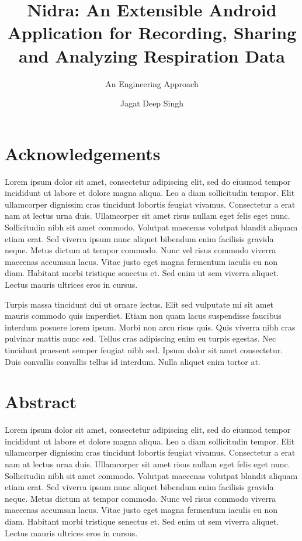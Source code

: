\documentclass[UKenglish]{ifimaster}  %
\title{Nidra: An Extensible Android Application for Recording, Sharing and Analyzing Respiration Data}
\subtitle{An Engineering Approach}
\author{Jagat Deep Singh}
\begin{document}
\duoforside[dept={Department of Informatics},   %
  program={Programming and Networks},  %
  long]                                        %

\frontmatter{}
\chapter*{Acknowledgements}
    Lorem ipsum dolor sit amet, consectetur adipiscing elit, sed do eiusmod tempor incididunt ut labore et dolore magna aliqua. Leo a diam sollicitudin tempor. Elit ullamcorper dignissim cras tincidunt lobortis feugiat vivamus. Consectetur a erat nam at lectus urna duis. Ullamcorper sit amet risus nullam eget felis eget nunc. Sollicitudin nibh sit amet commodo. Volutpat maecenas volutpat blandit aliquam etiam erat. Sed viverra ipsum nunc aliquet bibendum enim facilisis gravida neque. Metus dictum at tempor commodo. Nunc vel risus commodo viverra maecenas accumsan lacus. Vitae justo eget magna fermentum iaculis eu non diam. Habitant morbi tristique senectus et. Sed enim ut sem viverra aliquet. Lectus mauris ultrices eros in cursus.

    Turpis massa tincidunt dui ut ornare lectus. Elit sed vulputate mi sit amet mauris commodo quis imperdiet. Etiam non quam lacus suspendisse faucibus interdum posuere lorem ipsum. Morbi non arcu risus quis. Quis viverra nibh cras pulvinar mattis nunc sed. Tellus cras adipiscing enim eu turpis egestas. Nec tincidunt praesent semper feugiat nibh sed. Ipsum dolor sit amet consectetur. Duis convallis convallis tellus id interdum. Nulla aliquet enim tortor at.

\chapter*{Abstract}
    Lorem ipsum dolor sit amet, consectetur adipiscing elit, sed do eiusmod tempor incididunt ut labore et dolore magna aliqua. Leo a diam sollicitudin tempor. Elit ullamcorper dignissim cras tincidunt lobortis feugiat vivamus. Consectetur a erat nam at lectus urna duis. Ullamcorper sit amet risus nullam eget felis eget nunc. Sollicitudin nibh sit amet commodo. Volutpat maecenas volutpat blandit aliquam etiam erat. Sed viverra ipsum nunc aliquet bibendum enim facilisis gravida neque. Metus dictum at tempor commodo. Nunc vel risus commodo viverra maecenas accumsan lacus. Vitae justo eget magna fermentum iaculis eu non diam. Habitant morbi tristique senectus et. Sed enim ut sem viverra aliquet. Lectus mauris ultrices eros in cursus.
\end{document}
